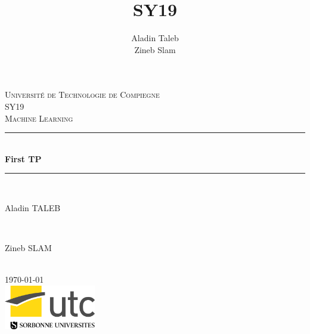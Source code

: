\documentclass[]{report}
\title{SY19}
\author{Aladin Taleb \\ Zineb Slam}
\begin{document}
	
\begin{titlepage}
	
	\newcommand{\HRule}{\rule{\linewidth}{0.5mm}} 
	
	\center 
	
	\textsc{\LARGE Université de Technologie de Compiegne}\\[1.5cm]
	\textsc{\Large SY19}\\[0.5cm] 
	\textsc{\large Machine Learning}\\[0.5cm]
		
	\HRule \\[0.4cm]
	{ \huge \bfseries First TP}\\[0.4cm] 
	\HRule \\[1.5cm]
		
	\begin{minipage}{0.4\textwidth}
		\begin{flushleft} \large
			Aladin \textsc{TALEB} 
		\end{flushleft}
	\end{minipage}
	~
	\begin{minipage}{0.4\textwidth}
		\begin{flushright} \large
			Zineb \textsc{SLAM} 
		\end{flushright}
	\end{minipage}\\[2cm]

	{\large \today}\\[2cm] 

	\includegraphics[width=40mm]{Figures/utc.jpg}\\ %

	\vfill
	
\end{titlepage}



\begin{abstract}
\end{abstract}
\end{document}
